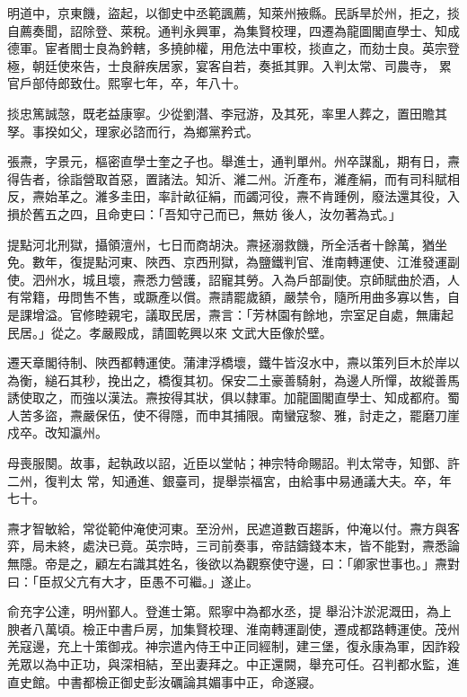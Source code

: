 \begin{pinyinscope}
 明道中，京東饑，盜起，以御史中丞範諷薦，知萊州掖縣。民訴旱於州，拒之，掞自薦奏聞，詔除登、萊稅。通判永興軍，為集賢校理，四遷為龍圖閣直學士、知成德軍。宦者閻士良為鈐轄，多撓帥權，用危法中軍校，掞直之，而劾士良。英宗登極，朝廷使來告，士良辭疾居家，宴客自若，奏抵其罪。入判太常、司農寺，
 累官戶部侍郎致仕。熙寧七年，卒，年八十。



 掞忠篤誠愨，既老益康寧。少從劉潛、李冠游，及其死，率里人葬之，置田贍其孥。事揆如父，理家必諮而行，為鄉黨矜式。



 張燾，字景元，樞密直學士奎之子也。舉進士，通判單州。州卒謀亂，期有日，燾得告者，徐詣營取首惡，置諸法。知沂、濰二州。沂產布，濰產絹，而有司科賦相反，燾始革之。濰多圭田，率計畝征絹，而蠲河役，燾不肯踵例，廢法還其役，入損於舊五之四，且命吏曰：「吾知守己而已，無妨
 後人，汝勿著為式。」



 提點河北刑獄，攝領澶州，七日而商胡決。燾拯溺救饑，所全活者十餘萬，猶坐免。數年，復提點河東、陜西、京西刑獄，為鹽鐵判官、淮南轉運使、江淮發運副使。泗州水，城且壞，燾悉力營護，詔寵其勞。入為戶部副使。京師賦曲於酒，人有常籍，毋問售不售，或蹶產以償。燾請罷歲額，嚴禁令，隨所用曲多寡以售，自是課增溢。官修睦親宅，議取民居，燾言：「芳林園有餘地，宗室足自處，無庸起民居。」從之。孝嚴殿成，請圖乾興以來
 文武大臣像於壁。



 遷天章閣待制、陜西都轉運使。蒲津浮橋壞，鐵牛皆沒水中，燾以策列巨木於岸以為衡，縋石其秒，挽出之，橋復其初。保安二土豪善騎射，為邊人所憚，故縱善馬誘使取之，而強以漢法。燾按得其狀，俱以隸軍。加龍圖閣直學士、知成都府。蜀人苦多盜，燾嚴保伍，使不得隱，而申其捕限。南蠻寇黎、雅，討走之，罷磨刀崖戍卒。改知瀛州。



 母喪服闋。故事，起執政以詔，近臣以堂帖；神宗特命賜詔。判太常寺，知鄧、許二州，復判太
 常，知通進、銀臺司，提舉崇福宮，由給事中易通議大夫。卒，年七十。



 燾才智敏給，常從範仲淹使河東。至汾州，民遮道數百趨訴，仲淹以付。燾方與客弈，局未終，處決已竟。英宗時，三司前奏事，帝詰鑄錢本末，皆不能對，燾悉論無隱。帝是之，顧左右識其姓名，後欲以為觀察使守邊，曰：「卿家世事也。」燾對曰：「臣叔父亢有大才，臣愚不可繼。」遂止。



 俞充字公達，明州鄞人。登進士第。熙寧中為都水丞，提
 舉沿汴淤泥溉田，為上腴者八萬頃。檢正中書戶房，加集賢校理、淮南轉運副使，遷成都路轉運使。茂州羌寇邊，充上十策御戎。神宗遣內侍王中正同經制，建三堡，復永康為軍，因詐殺羌眾以為中正功，與深相結，至出妻拜之。中正還闕，舉充可任。召判都水監，進直史館。中書都檢正御史彭汝礪論其媚事中正，命遂寢。




\end{pinyinscope}
